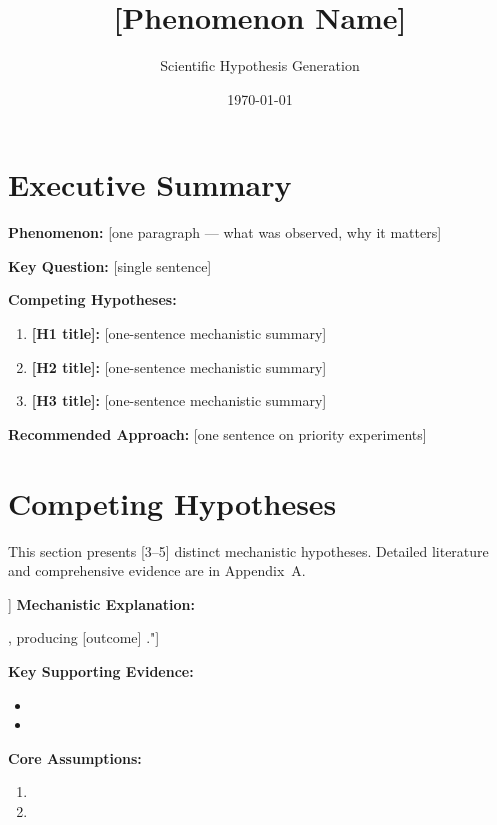 \documentclass[11pt,letterpaper]{article}
\title{[Phenomenon Name]}
\author{Scientific Hypothesis Generation}
\date{\today}
\begin{document}
\maketitle

\section*{Executive Summary}
\begin{summarybox}
\textbf{Phenomenon:} [one paragraph — what was observed, why it matters]\par\vspace{0.2cm}
\textbf{Key Question:} [single sentence]\par\vspace{0.2cm}
\textbf{Competing Hypotheses:}
\begin{enumerate}
  \item \textbf{[H1 title]:} [one-sentence mechanistic summary]
  \item \textbf{[H2 title]:} [one-sentence mechanistic summary]
  \item \textbf{[H3 title]:} [one-sentence mechanistic summary]
\end{enumerate}
\vspace{0.2cm}\textbf{Recommended Approach:} [one sentence on priority experiments]
\end{summarybox}

\section{Competing Hypotheses}
This section presents [3--5] distinct mechanistic hypotheses. Detailed literature and comprehensive evidence are in Appendix~A.

\newpage
\begin{hypothesisbox1}[Hypothesis 1: [Title]]
\textbf{Mechanistic Explanation:}\par
[1--2 brief paragraphs on HOW and WHY, e.g. "\dots operates through [pathway], producing [outcome] \citep{key2023}."]\par\vspace{0.2cm}
\textbf{Key Supporting Evidence:}
\begin{itemize}
  \item [evidence 1 \citep{a2023}]
  \item [evidence 2 \citep{b2022}]
\end{itemize}\vspace{0.2cm}
\textbf{Core Assumptions:}
\begin{enumerate}\item [assumption 1]\item [assumption 2]\end{enumerate}
\end{hypothesisbox1}
\end{document}
